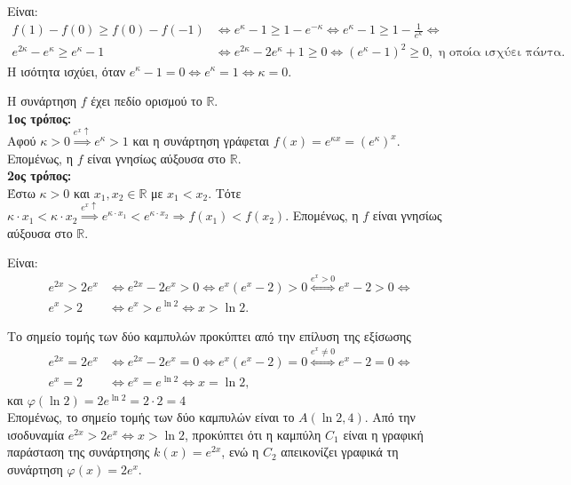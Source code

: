 \documentclass[11pt,a4paper,twoside]{book}
\begin{document}
\begin{alist}
\item Είναι:
\begin{align*}
f(1) - f(0) \ge f(0) - f(-1) &\Leftrightarrow e^\kappa - 1 \ge 1 - e^{-\kappa} \Leftrightarrow e^\kappa - 1 \ge 1 - \frac{1}{e^\kappa} \Leftrightarrow \\
e^{2\kappa} - e^\kappa \ge e^\kappa - 1 &\Leftrightarrow e^{2\kappa} - 2e^\kappa + 1 \ge 0 \Leftrightarrow (e^\kappa - 1)^2 \ge 0, \text{ η οποία ισχύει πάντα.}
\end{align*}
Η ισότητα ισχύει, όταν $e^\kappa - 1 = 0 \Leftrightarrow e^\kappa = 1 \Leftrightarrow \kappa = 0$.
\item Η συνάρτηση $f$ έχει πεδίο ορισμού το $\mathbb{R}$. \\
\textbf{1ος τρόπος:} \\
Αφού $\kappa > 0 \overset{e^x \uparrow}{\Longrightarrow} e^\kappa > 1$ και η συνάρτηση γράφεται $f(x) = e^{\kappa x} = (e^\kappa)^x$. Επομένως, η $f$ είναι γνησίως αύξουσα στο $\mathbb{R}$. \\
\textbf{2ος τρόπος:} \\
Έστω $\kappa > 0$ και $x_1, x_2 \in \mathbb{R}$ με $x_1 < x_2$.
Τότε $\kappa \cdot x_1 < \kappa \cdot x_2 \overset{e^x \uparrow}{\Longrightarrow} e^{\kappa\cdot x_1} < e^{\kappa\cdot x_2} \Rightarrow f(x_1) < f(x_2)$. Επομένως, η $f$ είναι γνησίως αύξουσα στο $\mathbb{R}$.
\item 
\begin{rlist}
\item Είναι:
\begin{align*}
e^{2x} > 2e^x &\Leftrightarrow e^{2x} - 2e^x > 0 \Leftrightarrow e^x(e^x - 2) > 0 \overset{e^x > 0}{\Longleftrightarrow} e^x - 2 > 0 \Leftrightarrow \\
e^x > 2 &\Leftrightarrow e^x > e^{\ln 2} \Leftrightarrow x > \ln 2.
\end{align*}
\item Το σημείο τομής των δύο καμπυλών προκύπτει από την επίλυση της εξίσωσης
\begin{align*}
e^{2x} = 2e^x &\Leftrightarrow e^{2x} - 2e^x = 0 \Leftrightarrow e^x(e^x - 2) = 0 \overset{e^x \ne 0}{\Longleftrightarrow} e^x - 2 = 0 \Leftrightarrow \\
e^x = 2 &\Leftrightarrow e^x = e^{\ln 2} \Leftrightarrow x = \ln 2,
\end{align*}
και $\varphi(\ln 2) = 2e^{\ln 2} = 2\cdot 2 = 4$ \\
Επομένως, το σημείο τομής των δύο καμπυλών είναι το $A(\ln 2, 4)$.
Από την ισοδυναμία $e^{2x} > 2e^x \Leftrightarrow x > \ln 2$, προκύπτει ότι η καμπύλη $C_1$ είναι η γραφική παράσταση της συνάρτησης $k(x) = e^{2x}$, ενώ η $C_2$ απεικονίζει γραφικά τη συνάρτηση $\varphi(x) = 2e^x$.
\end{rlist}
\end{alist}
\end{document}
